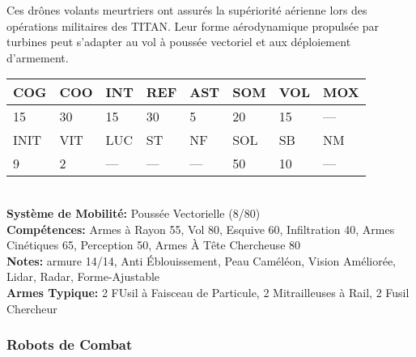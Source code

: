 Ces drônes volants meurtriers ont assurés la supériorité aérienne lors des opérations militaires des TITAN. Leur forme aérodynamique propulsée par turbines peut s'adapter au vol à poussée vectoriel et aux déploiement d'armement. \\ \begin{tabular}{|l|l|l|l|l|l|l|l|} \hline

COG &COO &INT &REF &AST &SOM &VOL &MOX \\ \hline

15 &30 &15 &30 &5 &20 &15 &— \\ \hline

INIT &VIT &LUC &ST &NF &SOL &SB &NM \\ \hline

9 &2 &— &— &— &50 &10 &— \\ \hline

\end{tabular} \\ \textbf{Système de Mobilité: }Poussée Vectorielle (8/80) \\ \textbf{Compétences:} Armes à Rayon 55, Vol 80, Esquive 60, Infiltration 40, Armes Cinétiques 65, Perception 50, Armes À Tête Chercheuse 80 \\ \textbf{Notes:} armure 14/14, Anti Éblouissement, Peau Caméléon, Vision Améliorée, Lidar, Radar, Forme-Ajustable \\ \textbf{Armes Typique:} 2 FUsil à Faisceau de Particule, 2 Mitrailleuses à Rail, 2 Fusil Chercheur 

\subsubsection{Robots de Combat} 

